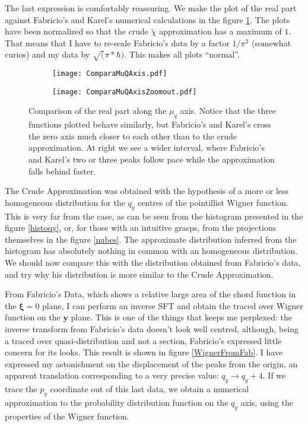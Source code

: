 \documentclass[a4paper,12pt]{article}
\newcommand{\yfase}{\mathbf{y}}
\newcommand{\xifase}{ {\boldsymbol{\xi}} }
\begin{document}
The last expression is comfortably reassuring. We make the plot of the real
part against Fabricio's and Karel's numerical calculations in the figure
\ref{comparatodas02}. The plots have been normalized so that the 
crude $\tilde{\chi}$ approximation has a maximum of $1$. That means
that I have to re-scale Fabricio's data by a factor $1/\pi^2$
(somewhat curios) and my data by $\sqrt(\pi*\hbar)$. This makes all
plots ``normal''.

\begin{figure}[h]
  \centering     
  \begin{subfigure}[b]{0.45\textwidth}
    \centering
    \texttt{[image: ComparaMuQAxis.pdf]}
   \end{subfigure}%
  \begin{subfigure}[b]{0.45\textwidth}
    \centering
    \texttt{[image: ComparaMuQAxisZoomout.pdf]}
    \end{subfigure}%
  \caption{Comparison of the real part along the $\mu_q$ axis. Notice that
the three functions plotted behave similarly, but Fabricio's and Karel's cross
the zero axis much closer to each other than to the crude approximation. At right we
see a wider interval, where Fabricio's and Karel's two or three peaks follow pace
while the approximation falls behind faster. }
  \label{comparatodas02}
\end{figure}

The Crude Approximation was obtained with the hypothesis of
a more or less homogeneous distribution for the $q_y$ centres of the
pointillist Wigner function. This is very far from the case, as can
be seen from the histogram presented in the figure \ref{histoqy},
or, for those with an intuitive grasps, from the projections themselves in
the figure \ref{nubes}. The approximate distribution
inferred from the histogram has absolutely nothing in common
with an homogeneous distribution.  We should now compare this with the distribution
obtained from Fabricio's data, and try why his distribution is more similar to
the Crude Approximation.

From Fabricio's Data, which shows a relative large area of
the chord function in the $\xifase=0$ plane, I can perform an inverse
SFT and obtain the traced over Wigner function on the $\yfase$ plane. This is
one of the things that keeps me perplexed: the inverse transform from Fabricio's data
doesn't look well centred, although, being a traced over quasi-distribution and not
a section, Fabricio's expressed little concern for its looks. This result is shown
in figure \ref{WignerFromFab}. I have expressed my astonishment on the displacement
of the peaks from the origin, an apparent translation corresponding
to a very precise value: $q_y \rightarrow q_y+4$. If we trace the $p_y$ coordinate
out of this last data, we obtain a numerical approximation to the probability
distribution function on the $q_y$ axis, using the properties of the
Wigner function.
\end{document}
